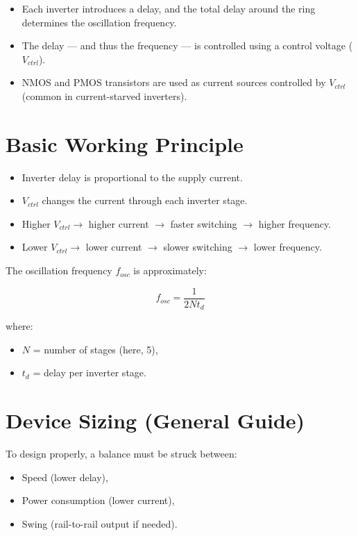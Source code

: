 \begin{itemize}
\begin{itemize}
    \item Each inverter introduces a delay, and the total delay around the ring determines the oscillation frequency.
    \item The delay --- and thus the frequency --- is controlled using a control voltage ($V_{ctrl}$).
    \item NMOS and PMOS transistors are used as current sources controlled by $V_{ctrl}$ (common in current-starved inverters).
\end{itemize}

\section{Basic Working Principle}

\begin{itemize}
    \item Inverter delay is proportional to the supply current.
    \item $V_{ctrl}$ changes the current through each inverter stage.
    \item Higher $V_{ctrl} \rightarrow$ higher current $\rightarrow$ faster switching $\rightarrow$ higher frequency.
    \item Lower $V_{ctrl} \rightarrow$ lower current $\rightarrow$ slower switching $\rightarrow$ lower frequency.
\end{itemize}

The oscillation frequency $f_{osc}$ is approximately:

\[
f_{osc} = \frac{1}{2N t_d}
\]

where:
\begin{itemize}
    \item $N$ = number of stages (here, 5),
    \item $t_d$ = delay per inverter stage.
\end{itemize}

\section{Device Sizing (General Guide)}

To design properly, a balance must be struck between:
\begin{itemize}
    \item Speed (lower delay),
    \item Power consumption (lower current),
    \item Swing (rail-to-rail output if needed).
\end{itemize}


\end{itemize}

